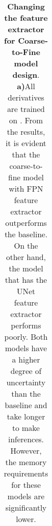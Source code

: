 \begin{table}[ht!]
\begin{adjustbox}{width=1\textwidth}
\begin{tabular}{|l
|c c
|c c
|c c
|c c
|c c
||c |c |c |c |c
|}
	
\hline
\end{tabular}
\end{adjustbox}
\caption[Changing the feature extractor for Coarse-to-Fine model design]{\textbf{Changing the feature extractor for Coarse-to-Fine model design}.
\textbf{a)}All {\mvsn} derivatives are trained on {\bms}. From the results, it is evident that the {\mvsn} coarse-to-fine model with FPN feature extractor outperforms the baseline. On the other hand, the model that has the UNet feature extractor performs poorly. Both models have a higher degree of uncertainty than the baseline and take longer to make inferences. However, the memory requirements for these models are significantly lower.
\label{tab:c2f}
}
\end{table}

